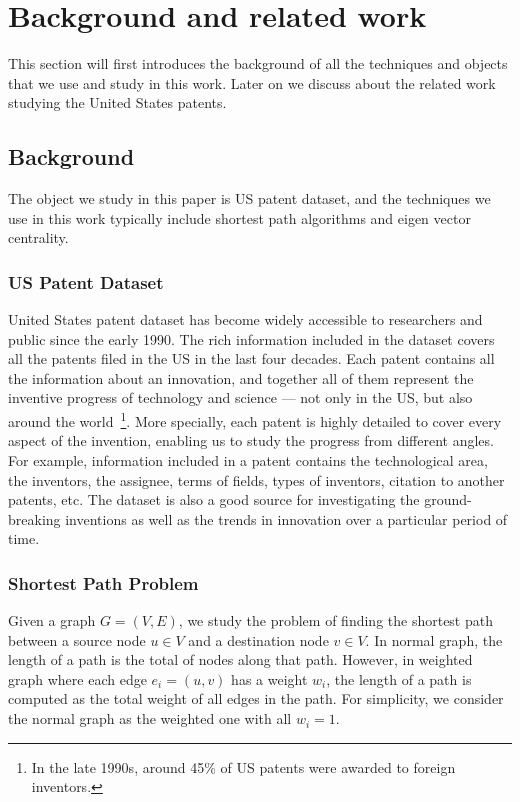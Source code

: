 \section{Background and related work}
This section will first introduces the background of all the techniques and objects that we use and study in
this work. Later on we discuss about the related work studying the United States patents.
\subsection{Background}
The object we study in this paper is US patent dataset, and the techniques we use in this work typically include
shortest path algorithms and eigen vector centrality.
\subsubsection{US Patent Dataset}%
United States patent dataset has become widely
accessible to researchers and public since the early 1990. The rich
information included in the dataset covers all the patents filed in the US
in the last four decades. Each patent contains all the information about an
innovation, and together all of them represent the inventive progress of
technology and science --- not only in the US, but also around the
world~\footnote{In the late 1990s, around 45\% of US patents were awarded to
foreign inventors.}. More specially, each patent is highly detailed to cover
every aspect of the invention, enabling us to study the progress from
different angles. For example, information included in a patent contains  the
technological area, the inventors, the assignee,  terms of fields, types of
inventors, citation to another patents, etc. The dataset is also a good
source  for investigating the ground-breaking inventions as well as the trends in 
innovation over a particular period of time.
 
\subsubsection{Shortest Path Problem} 
%
Given a graph $G = (V, E)$, we study the problem of finding the shortest path
between a source node $u \in V$ and a destination node $v \in V$. In normal
graph, the length of a path is the total of nodes along that path. However, in
weighted graph where each edge $e_i = (u, v)$ has a weight $w_i$, the length
of a path is computed as the total weight of all edges in the path. For
simplicity, we consider the normal graph as the weighted one with all $w_i=1$.

